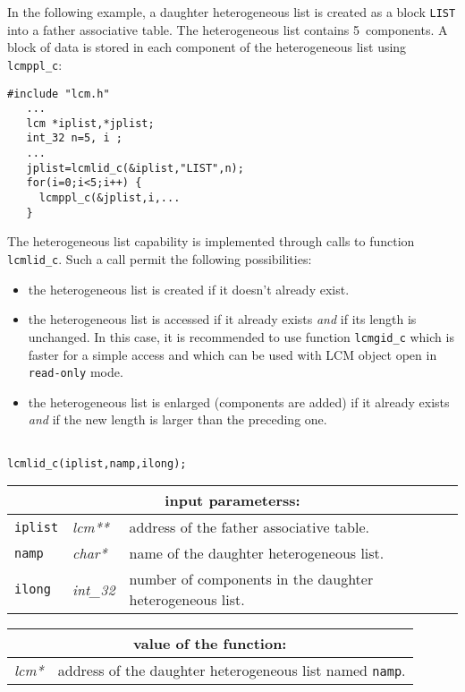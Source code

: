 In the following example, a daughter heterogeneous list is created as a block {\tt LIST}
into a father associative table. The heterogeneous list contains 5~components. A block of data
is stored in each component of the heterogeneous list using {\tt lcmppl\_c}:

\begin{verbatim}
#include "lcm.h"
   ...
   lcm *iplist,*jplist;
   int_32 n=5, i ;
   ...
   jplist=lcmlid_c(&iplist,"LIST",n);
   for(i=0;i<5;i++) {
     lcmppl_c(&jplist,i,...
   }
\end{verbatim}

\vskip 0.2cm

The heterogeneous list capability is implemented through calls to function {\tt lcmlid\_c}. Such a
call permit the following possibilities:
\begin{itemize}
\item the heterogeneous list is created if it doesn't already exist.
\item the heterogeneous list is accessed if it already exists {\sl and} if its length is unchanged. In this case,
it is recommended to use function {\tt lcmgid\_c} which is faster for a simple access and which can be used
with LCM object open in {\tt read-only} mode.
\item the heterogeneous list is enlarged (components are added) if it already exists {\sl and} if the new length is larger than the preceding one.
\end{itemize}

\begin{verbatim}

lcmlid_c(iplist,namp,ilong);
\end{verbatim}

\noindent
\begin{tabular}{|p{1.5cm}|p{2cm}|p{11cm}|}
\hline
\multicolumn{3}{|c|}{\bf input parameterss:} \\
\hline
{\tt iplist} & {\it lcm**} & address of the father associative table. \\
\hline
{\tt namp} & {\it char*} & name of the daughter heterogeneous list. \\
\hline
{\tt ilong} & {\it int\_32} & number of components in the daughter heterogeneous list.\\
\hline
\end{tabular}

\vskip 0.8cm

\noindent
\begin{tabular}{|p{4.0cm}|p{11cm}|}
\hline
\multicolumn{2}{|c|}{\bf value of the function:} \\
\hline
{\it lcm*} & address of the daughter heterogeneous list named {\tt namp}. \\
\hline
\end{tabular}

